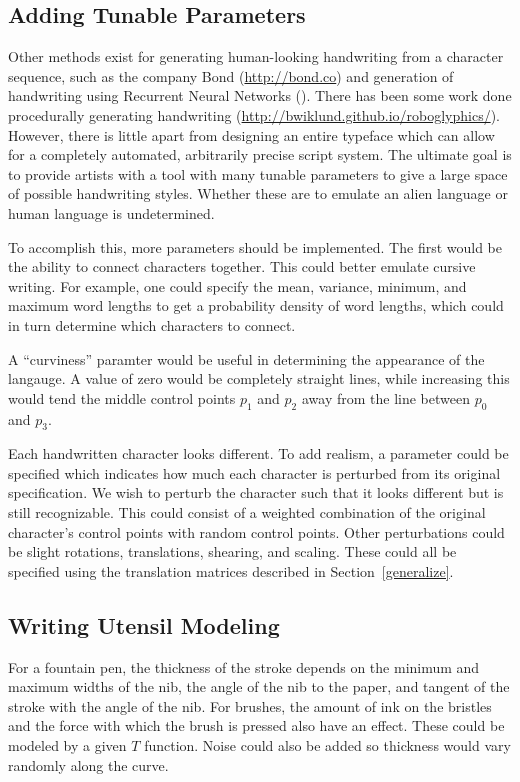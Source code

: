 \documentclass[12pt]{article}
\begin{document}
\subsection{Adding Tunable Parameters}
Other methods exist for generating human-looking handwriting from a character sequence, such as the company Bond (\url{http://bond.co}) and generation of handwriting using Recurrent Neural Networks (\cite{Graves:2013:RNN}). There has been some work done procedurally generating handwriting (\url{http://bwiklund.github.io/roboglyphics/}). However, there is little apart from designing an entire typeface which can allow for a completely automated, arbitrarily precise script system. The ultimate goal is to provide artists with a tool with many tunable parameters to give a large space of possible handwriting styles. Whether these are to emulate an alien language or human language is undetermined.

To accomplish this, more parameters should be implemented. The first would be the ability to connect characters together. This could better emulate cursive writing. For example, one could specify the mean, variance, minimum, and maximum word lengths to get a probability density of word lengths, which could in turn determine which characters to connect.

A ``curviness'' paramter would be useful in determining the appearance of the langauge. A value of zero would be completely straight lines, while increasing this would tend the middle control points $p_1$ and $p_2$ away from the line between $p_0$ and $p_3$.

Each handwritten character looks different. To add realism, a parameter could be specified which indicates how much each character is perturbed from its original specification. We wish to perturb the character such that it looks different but is still recognizable. This could consist of a weighted combination of the original character's control points with random control points. Other perturbations could be slight rotations, translations, shearing, and scaling. These could all be specified using the translation matrices described in Section~\ref{generalize}.

\subsection{Writing Utensil Modeling}
For a fountain pen, the thickness of the stroke depends on the minimum and maximum widths of the nib, the angle of the nib to the paper, and tangent of the stroke with the angle of the nib. For brushes, the amount of ink on the bristles and the force with which the brush is pressed also have an effect. These could be modeled by a given $T$ function. Noise could also be added so thickness would vary randomly along the curve.
\end{document}
